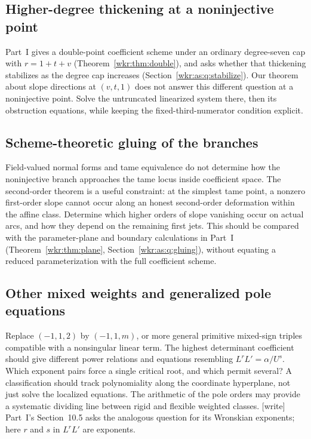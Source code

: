 \documentclass[11pt,a4paper]{article}
\numberwithin{equation}{section}
\theoremstyle{definition}
\theoremstyle{remark}
\begin{document}
\subsection{Higher-degree thickening at a noninjective point}
\label{wkr:as:sec:future-thick}

Part~I gives a double-point coefficient scheme under an ordinary
degree-seven cap with $r=1+t+v$ (Theorem~\ref{wkr:thm:double}), and asks
whether that thickening stabilizes as the degree cap increases
(Section~\ref{wkr:as:q:stabilize}). Our theorem about slope directions at
$(v,t,1)$ does not answer this different question at a noninjective
point. Solve the untruncated linearized system there, then its
obstruction equations, while keeping the fixed-third-numerator condition
explicit.

\subsection{Scheme-theoretic gluing of the branches}
\label{wkr:as:sec:future-glue}

Field-valued normal forms and tame equivalence do not determine how the
noninjective branch approaches the tame locus inside coefficient space.
The second-order theorem is a useful constraint: at the simplest tame
point, a nonzero first-order slope cannot occur along an honest
second-order deformation within the affine class. Determine which higher
orders of slope vanishing occur on actual arcs, and how they depend on
the remaining first jets. This should be compared with the
parameter-plane and boundary calculations in Part~I
(Theorem~\ref{wkr:thm:plane}, Section~\ref{wkr:as:q:gluing}), without
equating a reduced parameterization with the full coefficient scheme.

\subsection{Other mixed weights and generalized pole equations}

Replace $(-1,1,2)$ by $(-1,1,m)$, or more general primitive mixed-sign
triples compatible with a nonsingular linear term. The highest
determinant coefficient should give different power relations and
equations resembling $L^rL'=\alpha/U^s$. Which exponent pairs force a
single critical root, and which permit several? A classification should
track polynomiality along the coordinate hyperplane, not just solve the
localized equations. The arithmetic of the pole orders may provide a
systematic dividing line between rigid and flexible weighted classes.
\textup{[write]} Part~I's Section~10.5 asks the analogous question for
its Wronskian exponents; here $r$ and $s$ in $L^rL'$ are exponents.
\end{document}
